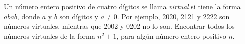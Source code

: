 Un número entero positivo de cuatro dígitos se llama \textit{virtual} si tiene la forma $\overline{abab}$, donde $a$ y $b$ son dígitos y $a \neq 0$. Por ejemplo, 2020, 2121 y 2222 son números virtuales, mientras que 2002 y 0202 no lo son. Encontrar todos los números virtuales de la forma $n^2+1$, para algún número entero positivo $n$.
